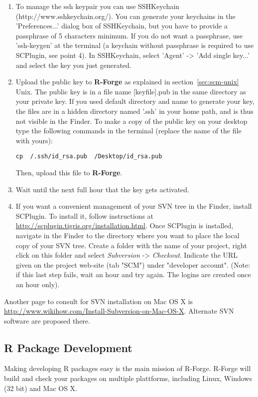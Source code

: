 \documentclass[a4paper]{article}
\let\code\texttt
\begin{document}
\begin{enumerate}
\item To manage the ssh keypair you can use SSHKeychain
(http://www.sshkeychain.org/). You can generate your keychains in the
'Preferences...' dialog box of SSHKeychain, but you have to provide a
passphrase of 5 characters minimum. If you do not want a passphrase,
use 'ssh-keygen' at the terminal (a keychain without passphrase is
required to use SCPlugin, see point 4). In SSHKeychain, select 'Agent'
-> 'Add single key...' and select the key you just generated. 

\item Upload the public key to \textbf{R-Forge} as explained in
  section~\ref{sec:scm-unix}
  Unix. The public key is in a file name [keyfile].pub in the same
  directory as your private key. If you used default directory and
  name to generate your key, the files are in a hidden directory named
  '.ssh' in your home path, and is thus not visible in the Finder. To
  make a copy of the public key on your desktop type the following
  commands in the terminal (replace the name of the file with yours): 

  \code{cp ~/.ssh/id\_rsa.pub ~/Desktop/id\_rsa.pub}
  
  Then, upload this file to \textbf{R-Forge}.

\item Wait until the next full hour that the key gets activated.

\item If you want a convenient management of your SVN tree in the
  Finder, install SCPlugin. To install it, follow instructions at
  \url{http://scplugin.tigris.org/installation.html}. Once SCPlugin is
  installed, navigate in the Finder to the directory where you want to
  place the local copy of your SVN tree. Create a folder with the name
  of your project, right click on this folder and select \textit{Subversion}
  -> \textit{Checkout}. Indicate the URL given on the project web-site (tab
  "SCM") under "developer account". (Note: if this last step fails,
  wait an hour and try again. The logins are created once an hour
  only). 

\end{enumerate}

Another page to consult for SVN installation on Mac OS X is
\url{http://www.wikihow.com/Install-Subversion-on-Mac-OS-X}. Alternate SVN
software are proposed there. 


\subsection{R Package Development}
Making developing R packages easy is the main mission of
R-Forge. R-Forge will build and check your packages on multiple
plattforms, including Linux, Windows (32 bit) and Mac OS X. 
\end{document}
